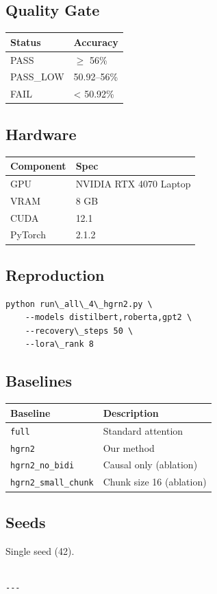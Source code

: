 \subsection{Quality Gate}

\begin{table}[H]
\centering
\small
\begin{tabular}{ll}
\toprule
\textbf{Status} & \textbf{Accuracy} \\
\midrule
PASS & $\ge$ 56\% \\
PASS\_LOW & 50.92--56\% \\
FAIL & \textless{} 50.92\% \\
\bottomrule
\end{tabular}
\end{table}

\subsection{Hardware}

\begin{table}[H]
\centering
\small
\begin{tabular}{ll}
\toprule
\textbf{Component} & \textbf{Spec} \\
\midrule
GPU & NVIDIA RTX 4070 Laptop \\
VRAM & 8 GB \\
CUDA & 12.1 \\
PyTorch & 2.1.2 \\
\bottomrule
\end{tabular}
\end{table}

\subsection{Reproduction}

\begin{lstlisting}
python run\_all\_4\_hgrn2.py \
    --models distilbert,roberta,gpt2 \
    --recovery\_steps 50 \
    --lora\_rank 8
\end{lstlisting}

\subsection{Baselines}

\begin{table}[H]
\centering
\small
\begin{tabular}{ll}
\toprule
\textbf{Baseline} & \textbf{Description} \\
\midrule
\texttt{full} & Standard attention \\
\texttt{hgrn2} & Our method \\
\texttt{hgrn2\_no\_bidi} & Causal only (ablation) \\
\texttt{hgrn2\_small\_chunk} & Chunk size 16 (ablation) \\
\bottomrule
\end{tabular}
\end{table}

\subsection{Seeds}

Single seed (42).
\begin{lstlisting}

---
\end{lstlisting}